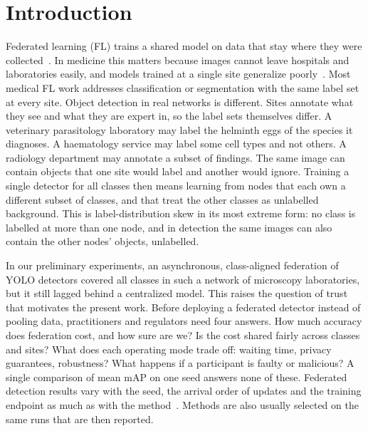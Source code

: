 \documentclass[pdflatex,sn-mathphys-num]{sn-jnl}
\begin{document}

\maketitle

\section{Introduction}\label{sec:intro}

Federated learning (FL) trains a shared model on data that stay where they were collected~\cite{mcmahan2017fedavg,kairouz2021advances}. In medicine this matters because images cannot leave hospitals and laboratories easily, and models trained at a single site generalize poorly~\cite{rieke2020future,sheller2020federated,kaissis2020secure,dayan2021federated}. Most medical FL work addresses classification or segmentation with the same label set at every site. Object detection in real networks is different. Sites annotate what they see and what they are expert in, so the label sets themselves differ. A veterinary parasitology laboratory may label the helminth eggs of the species it diagnoses. A haematology service may label some cell types and not others. A radiology department may annotate a subset of findings. The same image can contain objects that one site would label and another would ignore. Training a single detector for all classes then means learning from nodes that each own a different subset of classes, and that treat the other classes as unlabelled background. This is label-distribution skew in its most extreme form: no class is labelled at more than one node, and in detection the same images can also contain the other nodes' objects, unlabelled.

In our preliminary experiments, an asynchronous, class-aligned federation of YOLO detectors covered all classes in such a network of microscopy laboratories, but it still lagged behind a centralized model. This raises the question of trust that motivates the present work. Before deploying a federated detector instead of pooling data, practitioners and regulators need four answers. How much accuracy does federation cost, and how sure are we? Is the cost shared fairly across classes and sites? What does each operating mode trade off: waiting time, privacy guarantees, robustness? What happens if a participant is faulty or malicious? A single comparison of mean mAP on one seed answers none of these. Federated detection results vary with the seed, the arrival order of updates and the training endpoint as much as with the method~\cite{bouthillier2021variance}. Methods are also usually selected on the same runs that are then reported.
\end{document}
